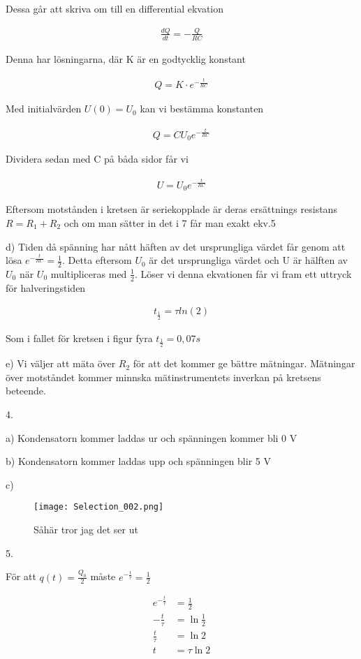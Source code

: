 \documentclass[a4paper]{article}
\begin{document}
Dessa går att skriva om till en differential ekvation

\begin{align}
    \frac{dQ}{dt} = -\frac{Q}{RC}
\end{align}

Denna har lösningarna, där K är en godtycklig konstant

\begin{align}
    Q = K \cdot e^{-\frac{t}{RC}}  
\end{align}

Med initialvärden $U(0) = U_0$ kan vi bestämma konstanten

\begin{align}
    Q = CU_0e^{-\frac{t}{RC}}
\end{align}

Dividera sedan med C på båda sidor får vi

\begin{align}
    U = U_0e^{-\frac{t}{RC}}
\end{align}

Eftersom motstånden i kretsen är seriekopplade är deras ersättnings resistans $R = R_1 + R_2$ och om man sätter in det i 7 får man exakt ekv.5

d) Tiden då spänning har nått häften av det ursprungliga värdet får genom att lösa $ e^{-\frac{t}{RC}} = \frac{1}{2}$. Detta eftersom $U_0$ är det ursprungliga värdet och U är hälften av $U_0$ när $U_0$ multipliceras med $\frac{1}{2}$. Löser vi denna ekvationen får vi fram ett uttryck för halveringstiden

\begin{align}
    t_{\frac{1}{2}} = \tau ln(2)
\end{align}

Som i fallet för kretsen i figur fyra $t_{\frac{1}{2}} = 0,07 s$

e) Vi väljer att mäta över $R_2$ för att det kommer ge bättre mätningar. Mätningar över motståndet kommer minnska mätinstrumentets inverkan på kretsens beteende. 

4.

a) Kondensatorn kommer laddas ur och spänningen kommer bli 0 V

b) Kondensatorn kommer laddas upp och spänningen blir 5 V

c) \begin{figure}[H]
    \begin{small}
        \begin{center}
            \texttt{[image: Selection\_002.png]}
        \end{center}
        \caption{Såhär tror jag det ser ut}
        \label{fig:spänning}
    \end{small}
\end{figure}

5. 

För att $q(t) = \frac{Q_0}{2}$ måste $e^{-\frac{t}{\tau}} = \frac{1}{2}$

\begin{align}
    e^{-\frac{t}{\tau}} &= \frac{1}{2}\\
    -\frac{t}{\tau} &= \ln{\frac{1}{2}}\\
    \frac{t}{\tau} &= \ln{2}\\
    t &= \tau \ln{2}
\end{align}
\end{document}
